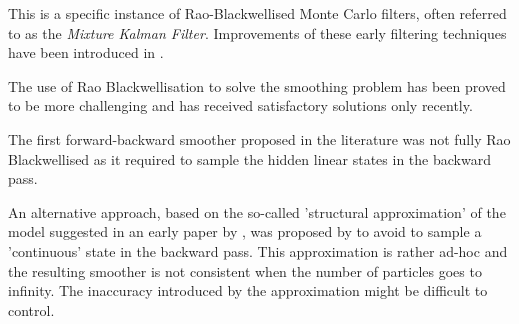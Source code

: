 This is a specific instance of Rao-Blackwellised Monte Carlo filters, often referred to as the \emph{Mixture Kalman Filter}. %
Improvements of these early filtering techniques  have been introduced in \cite{doucet:gordon:krishnamurthy:2001,schon:gustafsson:nordlund:2005}. %

The use of Rao Blackwellisation to solve the smoothing problem has been proved to be more challenging and has received satisfactory solutions only recently.

The first forward-backward smoother proposed in the literature \cite{fong:godsill:doucet:west:2002} was not fully Rao Blackwellised as it required to sample the hidden linear states in the backward pass.

An alternative approach, based on the so-called  'structural approximation' of the model suggested in an early paper by \cite{kim:1994}, was proposed by \cite{barber:2006} to avoid to sample a 'continuous' state in the backward pass. This approximation is rather ad-hoc and the resulting smoother is not consistent when the number of particles goes to infinity.
The inaccuracy  introduced by the approximation might be difficult to control.

